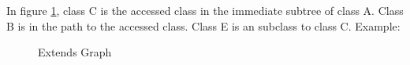 \documentclass{cslthse-msc}
\begin{document}
In figure \ref{fig:extends}, class C is the accessed class in the immediate subtree of class A. Class B is in the path to the accessed class. Class E is an subclass to class C.
Example:
\begin{figure}[H]
    \centering
    	\qquad
    	\subfloat{\raisebox{4.5 cm}{}}
    \caption{Extends Graph}
    \label{fig:extends}
\end{figure}
\end{document}
